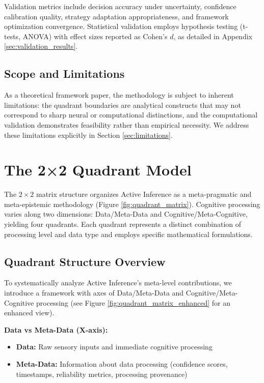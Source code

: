 \documentclass[
]{article}
\providecommand{\tightlist}{%
  \setlength{\itemsep}{0pt}\setlength{\parskip}{0pt}}
\begin{document}
Validation metrics include decision accuracy under uncertainty,
confidence calibration quality, strategy adaptation appropriateness, and
framework optimization convergence. Statistical validation employs
hypothesis testing (t-tests, ANOVA) with effect sizes reported as
Cohen's \(d\), as detailed in Appendix \ref{sec:validation_results}.

\subsection{Scope and Limitations}\label{scope-and-limitations}

As a theoretical framework paper, the methodology is subject to inherent
limitations: the quadrant boundaries are analytical constructs that may
not correspond to sharp neural or computational distinctions, and the
computational validation demonstrates feasibility rather than empirical
necessity. We address these limitations explicitly in Section
\ref{sec:limitations}.

\newpage

\section{The 2×2 Quadrant Model}\label{sec:quadrant_model}

The \(2 \times 2\) matrix structure organizes Active Inference as a
meta-pragmatic and meta-epistemic methodology (Figure
\ref{fig:quadrant_matrix}). Cognitive processing varies along two
dimensions: Data/Meta-Data and Cognitive/Meta-Cognitive, yielding four
quadrants. Each quadrant represents a distinct combination of processing
level and data type and employs specific mathematical formulations.

\subsection{Quadrant Structure Overview}\label{sec:quadrant_overview}

To systematically analyze Active Inference's meta-level contributions,
we introduce a framework with axes of Data/Meta-Data and
Cognitive/Meta-Cognitive processing (see Figure
\ref{fig:quadrant_matrix_enhanced} for an enhanced view).

\textbf{Data vs Meta-Data (X-axis):}

\begin{itemize}
\tightlist
\item
  \textbf{Data:} Raw sensory inputs and immediate cognitive processing
\item
  \textbf{Meta-Data:} Information about data processing (confidence
  scores, timestamps, reliability metrics, processing provenance)
\end{itemize}
\end{document}
